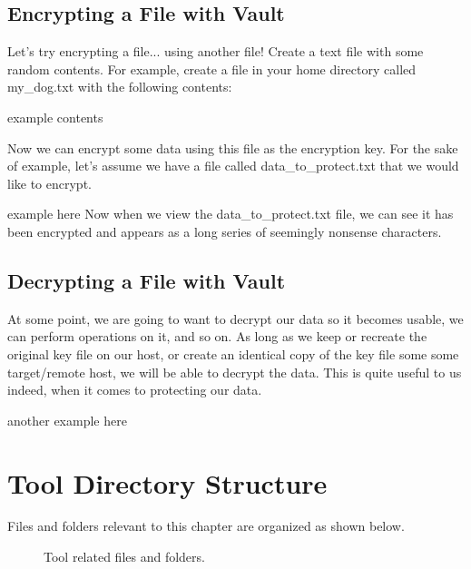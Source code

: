 \subsection{Encrypting a File with Vault}

\justify
Let's try encrypting a file... using another file! Create a text file
with some random contents. For example, create a file in your home
directory called my\_dog.txt with the following contents:

example contents

\justify
Now we can encrypt some data using this file as the encryption key. For
the sake of example, let's assume we have a file called
data\_to\_protect.txt that we would like to encrypt.

example here
\justify
Now when we view the data\_to\_protect.txt file, we can see it has been
encrypted and appears as a long series of seemingly nonsense characters.

\subsection{Decrypting a File with Vault}
\justify
At some point, we are going to want to decrypt our data so it becomes
usable, we can perform operations on it, and so on. As long as we keep
or recreate the original key file on our host, or create an identical
copy of the key file some some target/remote host, we will be able to
decrypt the data. This is quite useful to us indeed, when it comes to
protecting our data.

another example here

\clearpage

\section{Tool Directory Structure}
\justify
Files and folders relevant to this chapter are organized as shown below.

\begin{figure}[!htb]
	
	\caption{Tool related files and folders.}
\end{figure}
